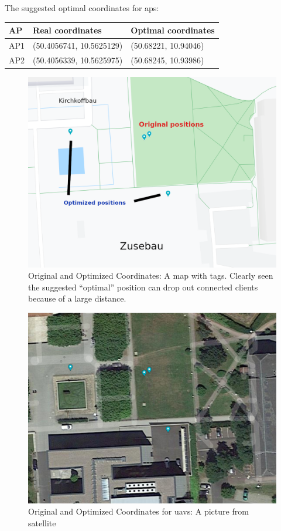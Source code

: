 The suggested optimal coordinates for \glspl{ap}:

\begin{longtable}[]{@{}lll@{}}
\toprule
AP & Real coordinates & Optimal coordinates\tabularnewline
\midrule
\endhead
AP1 & (50.4056741, 10.5625129) & (50.68221, 10.94046)\tabularnewline
AP2 & (50.4056339, 10.5625975) & (50.68245, 10.93986)\tabularnewline
\bottomrule
\end{longtable}

\begin{figure}[H]
	\centering
	\includegraphics[width=\linewidth,keepaspectratio]{images/Expt4_Result_of_optimization_map_with_names.png}
\caption{Original and Optimized Coordinates: A map with tags. Clearly
seen the suggested ``optimal'' position can drop out connected clients
because of a large distance.}
\end{figure}

\begin{figure}[H]
	\centering
	\includegraphics[width=\linewidth,keepaspectratio]{images/Expt4_Result_of_optimization_sattelite.png}
\caption{Original and Optimized Coordinates for \glspl{uav}: A picture from satellite}
\end{figure}


